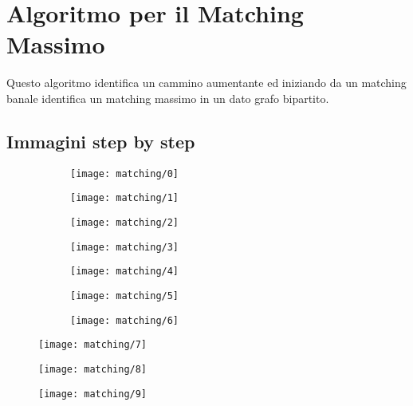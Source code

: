 \documentclass[\main/main.tex]{subfiles}
\begin{document}
\chapter{Algoritmo per il Matching Massimo}
Questo algoritmo identifica un cammino aumentante ed iniziando da un matching banale identifica un matching massimo in un dato grafo bipartito.

\section{Immagini step by step}
\begin{figure}
	\begin{subfigure}{0.5\textwidth}
		\texttt{[image: matching/0]}
	\end{subfigure}
	\begin{subfigure}{0.25\textwidth}
		\texttt{[image: matching/1]}
	\end{subfigure}
\end{figure}
\begin{figure}
	\begin{subfigure}{0.5\textwidth}
		\texttt{[image: matching/2]}
	\end{subfigure}
	\begin{subfigure}{0.5\textwidth}
		\texttt{[image: matching/3]}
	\end{subfigure}
\end{figure}

\begin{figure}
	\begin{subfigure}{0.5\textwidth}
		\texttt{[image: matching/4]}
	\end{subfigure}
	\begin{subfigure}{0.25\textwidth}
		\texttt{[image: matching/5]}
	\end{subfigure}
\end{figure}
\begin{figure}
	\begin{subfigure}{0.5\textwidth}
		\texttt{[image: matching/6]}
	\end{subfigure}
\end{figure}
\begin{figure}
	\texttt{[image: matching/7]}
\end{figure}
\begin{figure}
	\texttt{[image: matching/8]}
\end{figure}
\begin{figure}
	\texttt{[image: matching/9]}
\end{figure}
\end{document}
